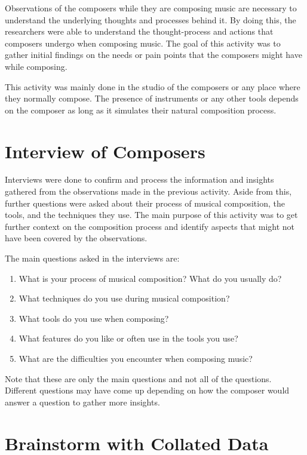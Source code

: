 		Observations of the composers while they are composing music are necessary to understand the underlying thoughts and processes behind it. By doing this, the researchers were able to understand the thought-process and actions that composers undergo when composing music. The goal of this activity was to gather initial findings on the needs or pain points that the composers might have while composing. 

		This activity was mainly done in the studio of the composers or any place where they normally compose. The presence of instruments or any other tools depends on the composer as long as it simulates their natural composition process. 


	\section{Interview of Composers}

		Interviews were done to confirm and process the information and insights gathered from the observations made in the previous activity. Aside from this, further questions were asked about their process of musical composition, the tools, and the techniques they use. The main purpose of this activity was to get further context on the composition process and identify aspects that might not have been covered by the observations. 

		The main questions asked in the interviews are: 
		\begin{enumerate}
			\item What is your process of musical composition? What do you usually do?
			\item What techniques do you use during musical composition?
			\item What tools do you use when composing?
			\item What features do you like or often use in the tools you use?
			\item What are the difficulties you encounter when composing music? 
		\end{enumerate}

		Note that these are only the main questions and not all of the questions. Different questions may have come up depending on how the composer would answer a question to gather more insights. 

	\section{Brainstorm with Collated Data}

